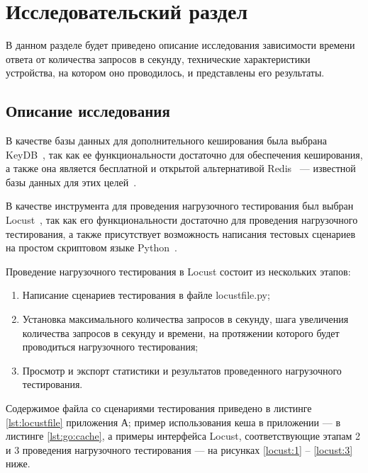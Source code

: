 \section{Исследовательский раздел}

В данном разделе будет приведено описание исследования зависимости времени ответа от количества запросов в секунду, технические характеристики устройства, на котором оно проводилось, и представлены его результаты.



\subsection{Описание исследования}

В качестве базы данных для дополнительного кеширования была выбрана KeyDB~\cite{keydb}, так как ее функциональности достаточно для обеспечения кеширования, а также она является бесплатной и открытой альтернативой Redis~\cite{redis} --- известной базы данных для этих целей~\cite{redis-jobs}.

В качестве инструмента для проведения нагрузочного тестирования был выбран Locust~\cite{locust}, так как его функциональности достаточно для проведения нагрузочного тестирования, а также присутствует возможность написания тестовых сценариев на простом скриптовом языке Python~\cite{python}.

Проведение нагрузочного тестирования в Locust состоит из нескольких этапов:
\begin{enumerate}
    \item Написание сценариев тестирования в файле locustfile.py;
    \item Установка максимального количества запросов в секунду, шага увеличения количества запросов в секунду и времени, на протяжении которого будет проводиться нагрузочного тестирования;
    \item Просмотр и экспорт статистики и результатов проведенного нагрузочного тестирования.
\end{enumerate}

Содержимое файла со сценариями тестирования приведено в листинге \ref{lst:locustfile} приложения А; пример использования кеша в приложении --- в листинге \ref{lst:go:cache}, а примеры интерфейса Locust, соответствующие этапам 2 и 3 проведения нагрузочного тестирования --- на рисунках \ref{locust:1} -- \ref{locust:3} ниже.


